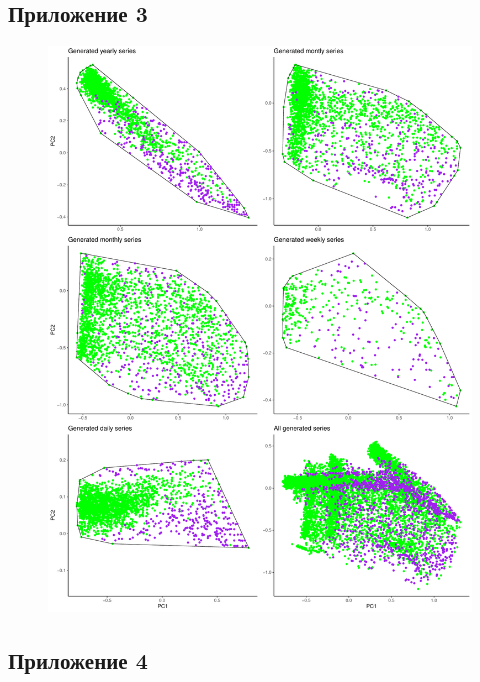 \documentclass[a4paper,12pt]{article}
\begin{document}
\subsection{Приложение 3} 
\label{all_gen}
\begin{figure}[!h]
	
	\begin{center}
		\includegraphics[width=
		\textwidth]{all_gen}%

	\end{center}
	
	
\end{figure} 

\newpage
\subsection{Приложение 4} 
\label{smape}
\begin{figure}[!h]
\end{figure}
\end{document}
